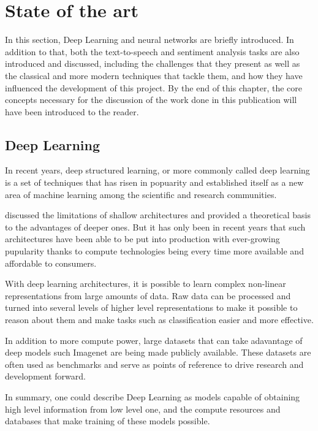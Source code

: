 \chapter{State of the art}

In this section, Deep Learning and neural networks are briefly introduced. In addition to that, both the text-to-speech and sentiment analysis tasks are also introduced and discussed, including the challenges that they present as well as the classical and more modern techniques that tackle them, and how they have influenced the development of this project. By the end of this chapter, the core concepts necessary for the discussion of the work done in this publication will have been introduced to the reader.

\section{Deep Learning}

In recent years, deep structured learning, or more commonly called deep learning is a set of techniques that has risen in popuarity and established itself as a new area of machine learning among the scientific and research communities. \cite{deng2014deep}

\cite{bengio2009learning} discussed the limitations of shallow architectures and provided a theoretical basis to the advantages of deeper ones. But it has only been in recent years that such architectures have been able to be put into production with ever-growing pupularity thanks to compute technologies being every time more available and affordable to consumers.

With deep learning architectures, it is possible to learn complex non-linear representations from large amounts of data. Raw data can be processed and turned into several levels of higher level representations to make it possible to reason about them and make tasks such as classification easier and more effective.

In addition to more compute power, large datasets that can take adavantage of deep models such Imagenet \cite{russakovsky2015imagenet} are being made publicly available. These datasets are often used as benchmarks and serve as points of reference to drive research and development forward.

In summary, one could describe Deep Learning as models capable of obtaining high level information from low level one, and the compute resources and databases that make training of these models possible.

